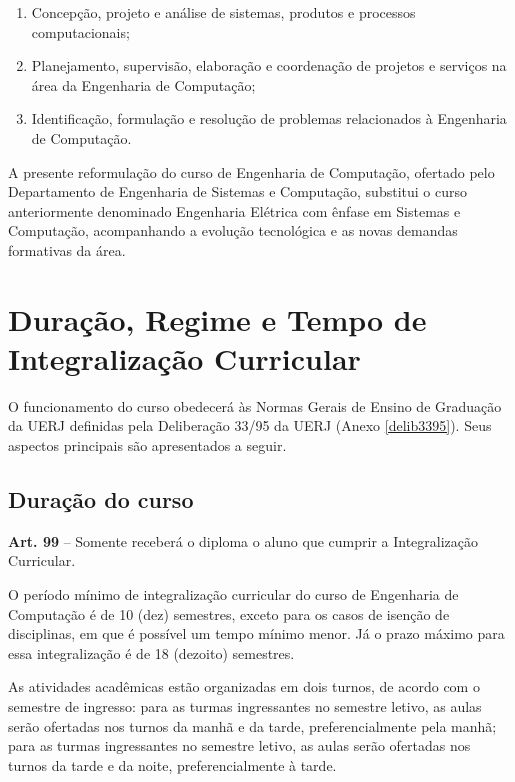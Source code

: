 \begin{enumerate}
    \item Concepção, projeto e análise de sistemas, produtos e processos computacionais;
    \item Planejamento, supervisão, elaboração e coordenação de projetos e serviços na área da Engenharia de Computação;
    \item Identificação, formulação e resolução de problemas relacionados à Engenharia de Computação.
\end{enumerate}

A presente reformulação do curso de Engenharia de Computação, ofertado pelo Departamento de Engenharia de Sistemas e Computação, substitui o curso anteriormente denominado Engenharia Elétrica com ênfase em Sistemas e Computação, acompanhando a evolução tecnológica e as novas demandas formativas da área.

\section{Duração, Regime e Tempo de Integralização Curricular}

O funcionamento do curso obedecerá às Normas Gerais de Ensino de Graduação da UERJ definidas pela Deliberação  33/95 da UERJ (Anexo \ref{delib3395}). Seus aspectos principais são apresentados a seguir.

\subsection{Duração do curso}
\label{sec:integralizacao}
\begin{itquotation}
    \textbf{Art. 99} -- Somente receberá o diploma o aluno que cumprir a Integralização Curricular.
\end{itquotation}

O período mínimo de integralização curricular do curso de Engenharia de Computação  é de 10 (dez) semestres, exceto para os casos de isenção de disciplinas, em que é possível um tempo mínimo menor. Já o prazo máximo para essa integralização é de 18 (dezoito) semestres.

As atividades acadêmicas estão organizadas em dois turnos, de acordo com o semestre de ingresso: para as turmas ingressantes no  semestre letivo, as aulas serão ofertadas nos turnos da manhã e da tarde, preferencialmente pela manhã; para as turmas ingressantes no  semestre letivo, as aulas serão ofertadas nos turnos da tarde e da noite, preferencialmente à tarde.

